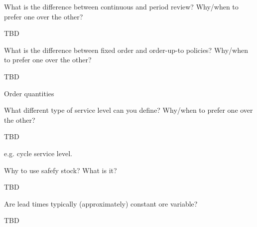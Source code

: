 \begin{exercise}
  What is the difference between continuous and period review? Why/when to prefer one over the other?
  \begin{solution}
    TBD
  \end{solution}
\end{exercise}

\begin{exercise}
  What is the difference between fixed order and order-up-to policies?
  Why/when to prefer one over the other?
  \begin{solution}
    TBD

Order quantities

  \end{solution}
\end{exercise}

\begin{exercise}
  What  different type of service level can you define?
  Why/when to prefer one over the other?
  \begin{solution}
    TBD

e.g. cycle service level.
  \end{solution}
\end{exercise}

\begin{exercise}
  Why to use safefy stock? What is it? 
  \begin{solution}
    TBD
  \end{solution}
\end{exercise}

\begin{exercise}
  Are lead times typically (approximately) constant ore variable?
  \begin{solution}
    TBD
  \end{solution}
\end{exercise}



\clearpage

